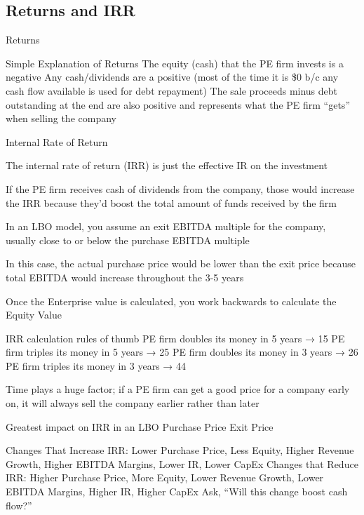 \documentclass[10pt]{article}
\begin{document}
  \subsection{Returns and IRR}

    \begin{core}{Returns}

      Simple Explanation of Returns
      The equity (cash) that the PE firm invests is a negative
      Any cash/dividends are a positive (most of the time it is \$0 b/c any cash flow available is used for debt repayment)
      The sale proceeds minus debt outstanding at the end are also positive and represents what the PE firm “gets” when selling the company

    \end{core}

    \begin{core}{Internal Rate of Return}

      The internal rate of return (IRR) is just the effective IR on the investment

      If the PE firm receives cash of dividends from the company, those would increase the IRR because they’d boost the total amount of funds received by the firm

      In an LBO model, you assume an exit EBITDA multiple for the company, usually close to or below the purchase EBITDA multiple

      In this case, the actual purchase price would be lower than the exit price because total EBITDA would increase throughout the 3-5 years

      Once the Enterprise value is calculated, you work backwards to calculate the Equity Value

      IRR calculation rules of thumb
      PE firm doubles its money in 5 years → 15%
      PE firm triples its money in 5 years → 25%
      PE firm doubles its money in 3 years → 26%
      PE firm triples its money in 3 years → 44%

      Time plays a huge factor; if a PE firm can get a good price for a company early on, it will always sell the company earlier rather than later

      Greatest impact on IRR in an LBO
      Purchase Price
      Exit Price

      Changes That Increase IRR: Lower Purchase Price, Less Equity, Higher Revenue Growth, Higher EBITDA Margins, Lower IR, Lower CapEx
      Changes that Reduce IRR: Higher Purchase Price, More Equity, Lower Revenue Growth, Lower EBITDA Margins, Higher IR, Higher CapEx
      Ask, “Will this change boost cash flow?”

    \end{core}
\end{document}
